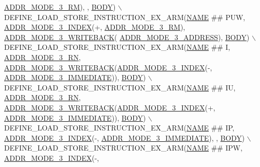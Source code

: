 \begin{DoxyCode}
      \mbox{\hyperlink{isa-arm_8c_a9db2761742bcba3e3d9cfbfd49037ed2}{ADDR\_MODE\_3\_RM}}), , \mbox{\hyperlink{gzlog_8c_aa6bdf6a6d9916c343e1e17774d84a156}{BODY}}) \(\backslash\)
    DEFINE\_LOAD\_STORE\_INSTRUCTION\_EX\_ARM(\mbox{\hyperlink{inflate_8h_a164ea0159d5f0b5f12a646f25f99eceaa67bc2ced260a8e43805d2480a785d312}{NAME}} ## PUW, \mbox{\hyperlink{isa-arm_8c_a7ce011f92bca494c8cd99803901c5b50}{ADDR\_MODE\_3\_INDEX}}(+, 
      \mbox{\hyperlink{isa-arm_8c_a9db2761742bcba3e3d9cfbfd49037ed2}{ADDR\_MODE\_3\_RM}}), \mbox{\hyperlink{isa-arm_8c_a0d44b0f2a0d138f9a20b8c02b2b48729}{ADDR\_MODE\_3\_WRITEBACK}}(
      \mbox{\hyperlink{isa-arm_8c_ae2a849434504cbd28290fd7743dead97}{ADDR\_MODE\_3\_ADDRESS}}), \mbox{\hyperlink{gzlog_8c_aa6bdf6a6d9916c343e1e17774d84a156}{BODY}}) \(\backslash\)
    DEFINE\_LOAD\_STORE\_INSTRUCTION\_EX\_ARM(\mbox{\hyperlink{inflate_8h_a164ea0159d5f0b5f12a646f25f99eceaa67bc2ced260a8e43805d2480a785d312}{NAME}} ## I, \mbox{\hyperlink{isa-arm_8c_af5d2ca0f35ebb0be20fb9caf92ec6403}{ADDR\_MODE\_3\_RN}}, 
      \mbox{\hyperlink{isa-arm_8c_a0d44b0f2a0d138f9a20b8c02b2b48729}{ADDR\_MODE\_3\_WRITEBACK}}(\mbox{\hyperlink{isa-arm_8c_a7ce011f92bca494c8cd99803901c5b50}{ADDR\_MODE\_3\_INDEX}}(-, 
      \mbox{\hyperlink{isa-arm_8c_afa669bfbc7c5208d436af2e761d2ebd3}{ADDR\_MODE\_3\_IMMEDIATE}})), \mbox{\hyperlink{gzlog_8c_aa6bdf6a6d9916c343e1e17774d84a156}{BODY}}) \(\backslash\)
    DEFINE\_LOAD\_STORE\_INSTRUCTION\_EX\_ARM(\mbox{\hyperlink{inflate_8h_a164ea0159d5f0b5f12a646f25f99eceaa67bc2ced260a8e43805d2480a785d312}{NAME}} ## IU, \mbox{\hyperlink{isa-arm_8c_af5d2ca0f35ebb0be20fb9caf92ec6403}{ADDR\_MODE\_3\_RN}}, 
      \mbox{\hyperlink{isa-arm_8c_a0d44b0f2a0d138f9a20b8c02b2b48729}{ADDR\_MODE\_3\_WRITEBACK}}(\mbox{\hyperlink{isa-arm_8c_a7ce011f92bca494c8cd99803901c5b50}{ADDR\_MODE\_3\_INDEX}}(+, 
      \mbox{\hyperlink{isa-arm_8c_afa669bfbc7c5208d436af2e761d2ebd3}{ADDR\_MODE\_3\_IMMEDIATE}})), \mbox{\hyperlink{gzlog_8c_aa6bdf6a6d9916c343e1e17774d84a156}{BODY}}) \(\backslash\)
    DEFINE\_LOAD\_STORE\_INSTRUCTION\_EX\_ARM(\mbox{\hyperlink{inflate_8h_a164ea0159d5f0b5f12a646f25f99eceaa67bc2ced260a8e43805d2480a785d312}{NAME}} ## IP, \mbox{\hyperlink{isa-arm_8c_a7ce011f92bca494c8cd99803901c5b50}{ADDR\_MODE\_3\_INDEX}}(-, 
      \mbox{\hyperlink{isa-arm_8c_afa669bfbc7c5208d436af2e761d2ebd3}{ADDR\_MODE\_3\_IMMEDIATE}}), , \mbox{\hyperlink{gzlog_8c_aa6bdf6a6d9916c343e1e17774d84a156}{BODY}}) \(\backslash\)
    DEFINE\_LOAD\_STORE\_INSTRUCTION\_EX\_ARM(\mbox{\hyperlink{inflate_8h_a164ea0159d5f0b5f12a646f25f99eceaa67bc2ced260a8e43805d2480a785d312}{NAME}} ## IPW, \mbox{\hyperlink{isa-arm_8c_a7ce011f92bca494c8cd99803901c5b50}{ADDR\_MODE\_3\_INDEX}}(-, 

\end{DoxyCode}
